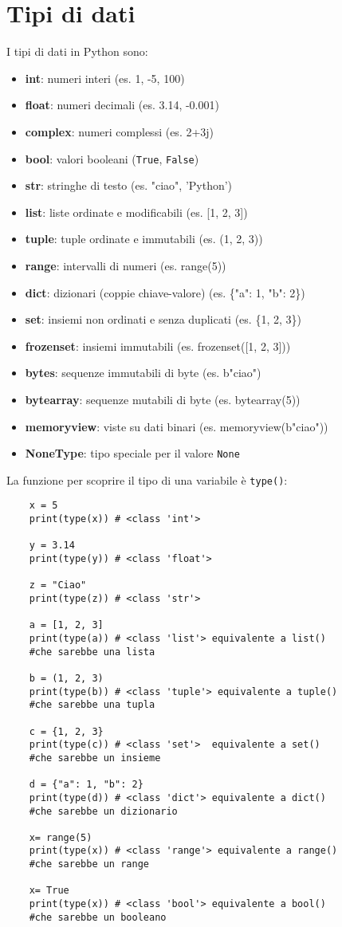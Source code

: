 \documentclass[a4paper,12pt]{article}
\begin{document}
\section{Tipi di dati}
I tipi di dati in Python sono:
\begin{itemize}
    \item \textbf{int}: numeri interi (es. 1, -5, 100)
    \item \textbf{float}: numeri decimali (es. 3.14, -0.001)
    \item \textbf{complex}: numeri complessi (es. 2+3j)
    \item \textbf{bool}: valori booleani (\texttt{True}, \texttt{False})
    \item \textbf{str}: stringhe di testo (es. "ciao", 'Python')
    \item \textbf{list}: liste ordinate e modificabili (es. [1, 2, 3])
    \item \textbf{tuple}: tuple ordinate e immutabili (es. (1, 2, 3))
    \item \textbf{range}: intervalli di numeri (es. range(5))
    \item \textbf{dict}: dizionari (coppie chiave-valore) (es. \{"a": 1, "b": 2\})
    \item \textbf{set}: insiemi non ordinati e senza duplicati (es. \{1, 2, 3\})
    \item \textbf{frozenset}: insiemi immutabili (es. frozenset([1, 2, 3]))
    \item \textbf{bytes}: sequenze immutabili di byte (es. b"ciao")
    \item \textbf{bytearray}: sequenze mutabili di byte (es. bytearray(5))
    \item \textbf{memoryview}: viste su dati binari (es. memoryview(b"ciao"))
    \item \textbf{NoneType}: tipo speciale per il valore \texttt{None}
\end{itemize}
\vspace{1em}
La funzione per scoprire il tipo di una variabile è \texttt{type()}:
\begin{lstlisting}
    x = 5
    print(type(x)) # <class 'int'>

    y = 3.14
    print(type(y)) # <class 'float'>

    z = "Ciao"
    print(type(z)) # <class 'str'>

    a = [1, 2, 3]
    print(type(a)) # <class 'list'> equivalente a list()
    #che sarebbe una lista

    b = (1, 2, 3)
    print(type(b)) # <class 'tuple'> equivalente a tuple()
    #che sarebbe una tupla

    c = {1, 2, 3}
    print(type(c)) # <class 'set'>  equivalente a set()
    #che sarebbe un insieme

    d = {"a": 1, "b": 2}
    print(type(d)) # <class 'dict'> equivalente a dict()
    #che sarebbe un dizionario

    x= range(5)
    print(type(x)) # <class 'range'> equivalente a range()
    #che sarebbe un range

    x= True
    print(type(x)) # <class 'bool'> equivalente a bool()
    #che sarebbe un booleano
\end{lstlisting}
\end{document}
